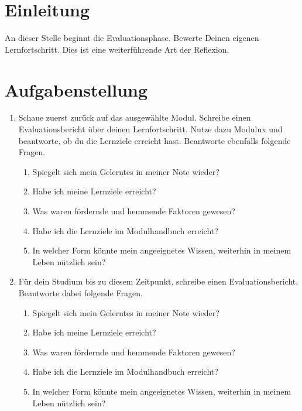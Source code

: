 \documentclass[a4paper,oneside]{scrarticle}
\begin{document}
	\pagebreak 
	
	\section*{Einleitung}
	An dieser Stelle beginnt die Evaluationsphase. Bewerte Deinen eigenen Lernfortschritt. Dies ist eine weiterführende Art der Reflexion. 
	
	\section*{Aufgabenstellung}

	\begin{enumerate}
		\item Schaue zuerst zurück auf das ausgewählte Modul. Schreibe einen Evaluationsbericht über deinen Lernfortschritt. Nutze dazu Modulux und beantworte, ob du die Lernziele erreicht hast. Beantworte ebenfalls folgende Fragen.
		\begin{enumerate}
			\item Spiegelt sich mein Gelerntes in meiner Note wieder?
			\item Habe ich meine Lernziele erreicht?
			\item Was waren fördernde und hemmende Faktoren gewesen?
			\item Habe ich die Lernziele im Modulhandbuch erreicht?
			\item In welcher Form könnte mein angeeignetes Wissen, weiterhin in meinem Leben nützlich sein?
		\end{enumerate}
		\item Für dein Studium bis zu diesem Zeitpunkt, schreibe einen Evaluationsbericht. Beantworte dabei folgende Fragen.
		\begin{enumerate}
			\item Spiegelt sich mein Gelerntes in meiner Note wieder?
			\item Habe ich meine Lernziele erreicht?
			\item Was waren fördernde und hemmende Faktoren gewesen?
			\item Habe ich die Lernziele im Modulhandbuch erreicht?
			\item In welcher Form könnte mein angeeignetes Wissen, weiterhin in meinem Leben nützlich sein?
		\end{enumerate}

	\end{enumerate}
\end{document}
